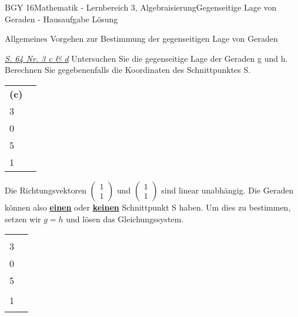 \documentclass[oneside,openany,headings=optiontotoc,11pt,numbers=noenddot]{scrreprt}
\begin{document}
	\begin{worksheet}{BGY 16}{Mathematik - Lernbereich 3, Algebraisierung}{Gegenseitige Lage von Geraden - Hausaufgabe Lösung}
		
		\begin{framed}
			\noindent
			\tiny{\color{codegray}Allgemeines Vorgehen zur Bestimmung der gegenseitigen Lage von Geraden}\\
			\normalsize
		\end{framed}
		
		\begin{framed}
			\noindent
			\underline{\textit{S. 64 Nr. 3 c \& d}} Untersuchen Sie die gegenseitige Lage der Geraden g und h. Berechnen Sie gegebenenfalls die Koordinaten des Schnittpunktes S.\\
			\par\noindent
			\begin{tabularx}{\textwidth}{XX}
				\textbf{(c)} \(g: \vec{x} = \left(\begin{array}{c}7\\3\end{array}\right) + r\left(\begin{array}{c}1\\0\end{array}\right)\) & \(h: \vec{x} = \left(\begin{array}{c}2\\5\end{array}\right) + t\left(\begin{array}{c}1\\1\end{array}\right)\)
			\end{tabularx}
			Die Richtungsvektoren \(\left(\begin{array}{c}1\\1\end{array}\right)\) und \(\left(\begin{array}{c}1\\1\end{array}\right)\) sind \color{blue}linear unabhängig\normalcolor. Die Geraden können also \textbf{\underline{einen}} oder \textbf{\underline{keinen}} Schnittpunkt S haben. Um dies zu bestimmen, setzen wir \(g=h\) und lösen das Gleichungssystem.\\
			\par\noindent
			\begin{tabularx}{\textwidth}{X|X}
				\(\left(\begin{array}{c}7\\3\end{array}\right) + r\left(\begin{array}{c}1\\0\end{array}\right) = \left(\begin{array}{c}2\\5\end{array}\right) + t\left(\begin{array}{c}1\\1\end{array}\right)\) & \begin{tabular}{lll}

\end{tabular}
\end{tabularx}
\end{framed}
\end{worksheet}
\end{document}
